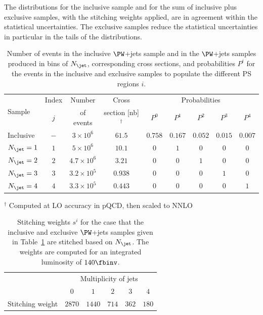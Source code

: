 The distributions for the inclusive sample and for the sum of inclusive plus exclusive samples, with the stitching weights applied, are in agreement within the statistical uncertainties.
The exclusive samples reduce the statistical uncertainties in particular in the tails of the distributions.

\begin{table}[h!]
\begin{center}
\def\arraystretch{1.3}
\begin{tabular}{l|c|c|c|ccccc}
\multirow{2}{20mm}{Sample} & Index & Number    & Cross                    & \multicolumn{5}{c}{Probabilities}               \\
                           & $j$   & of events & section [nb]$^{\dagger}$ & $P^{0}$ & $P^{1}$ & $P^{2}$ & $P^{3}$ & $P^{4}$ \\
\hline
Inclusive                  & $-$   & $3 \times 10^{6}$ & $61.5$ & $0.758$ & $0.167$ & $0.052$ & $0.015$ & $0.007$ \\
$N_{\jet} = 1$             & $1$   & $5 \times 10^{6}$   & $10.1$  & $0$     & $1$     & $0$     & $0$     & $0$  \\
$N_{\jet} = 2$             & $2$   & $4.7 \times 10^{6}$ & $3.21$  & $0$     & $0$     & $1$     & $0$     & $0$  \\
$N_{\jet} = 3$             & $3$   & $3.2 \times 10^{5}$ & $0.938$ & $0$     & $0$     & $0$     & $1$     & $0$  \\
$N_{\jet} = 4$             & $4$   & $3.3 \times 10^{5}$ & $0.443$ & $0$     & $0$     & $0$     & $0$     & $1$  \\
\end{tabular}
\end{center}
$^{\dagger}$ Computed at LO accuracy in pQCD, then scaled to NNLO
\caption{
  Number of events in the inclusive $\PW$+jets sample and in the $\PW$+jets samples produced in bins of $N_{\jet}$,
  corresponding cross sections,
  and probabilities $P^{i}$ for the events in the inclusive and exclusive samples to populate the different PS regions $i$.
}
\label{tab:samples_and_probabilities_WJets_vs_Njet}
\end{table}

\begin{table}[h!]
\begin{center}
\begin{tabular}{l|ccccc}
 & \multicolumn{5}{c}{Multiplicity of jets} \\
 & $0$ & $1$ & $2$ & $3$ & $4$ \\
\hline
Stitching weight & $2870$ & $1440$ & $714$ & $362$ & $180$ \\
\end{tabular}
\end{center}
\caption{
  Stitching weights $s^{i}$ for the case that the inclusive and exclusive $\PW$+jets samples 
  given in Table~\ref{tab:samples_and_probabilities_WJets_vs_Njet}
  are stitched based on $N_{\jet}$.
  The weights are computed for an integrated luminosity of $140\fbinv$.
}
\label{tab:weights_WJets_vs_Njet}
\end{table}

